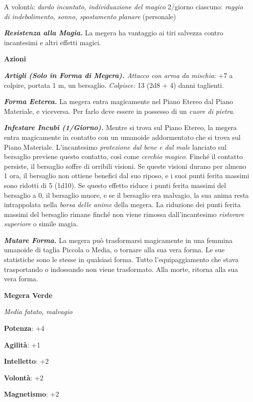 \begin{multicols}{2}
A volontà: \emph{dardo incantato, individuazione del magico} 2/giorno
ciascuno: \emph{raggio di indebolimento, sonno, spostamento}
\emph{planare} (personale)

\emph{\textbf{Resistenza alla Magia.}} La megera ha vantaggio ai tiri
salvezza contro incantesimi e altri effetti magici.

\smallskip\textbf{Azioni}

\emph{\textbf{Artigli (Solo in Forma di Megera).} Attacco con arma da
mischia}: +7 a colpire, portata 1 m, un bersaglio. \emph{Colpisce:} 13
(2d8 + 4) danni taglienti.

\emph{\textbf{Forma Eeterea.}} La megera entra magicamente nel Piano
Etereo dal Piano Materiale, e viceversa. Per farlo deve essere in
possesso di un \emph{cuore di pietra}.

\emph{\textbf{Infestare Incubi (1/Giorno).}} Mentre si trova sul Piano
Etereo, la megera entra magicamente in contatto con un umanoide
addormentato che si trova sul Piano Materiale. L'incantesimo
\emph{protezione dal bene e dal male} lanciato sul bersaglio previene
questo contatto, così come \emph{cerchio magico}. Finché il contatto
persiste, il bersaglio soffre di orribili visioni. Se queste visioni
durano per almeno 1 ora, il bersaglio non ottiene benefici dal suo
riposo, e i suoi punti ferita massimi sono ridotti di 5 (1d10). Se
questo effetto riduce i punti ferita massimi del bersaglio a 0, il
bersaglio muore, e se il bersaglio era malvagio, la sua anima resta
intrappolata nella \emph{borsa} \emph{delle anime} della megera. La
riduzione dei punti ferita massimi del bersaglio rimane finché non viene
rimossa dall'incantesimo \emph{ristorare} \emph{superiore} o simile
magia.

\emph{\textbf{Mutare Forma.}} La megera può trasformarsi magicamente in
una femmina umanoide di taglia Piccola o Media, o tornare alla sua vera
forma. Le sue statistiche sono le stesse in qualsiasi forma. Tutto
l'equipaggiamento che stava trasportando o indossando non viene
trasformato. Alla morte, ritorna alla sua vera forma.



\textbf{Megera Verde}

\emph{Media fatato, malvagio}

\textbf{Potenza}: +4

\textbf{Agilità}: +1

\textbf{Intelletto}: +2

\textbf{Volontà}: +2

\textbf{Magnetismo}: +2


\end{multicols}
